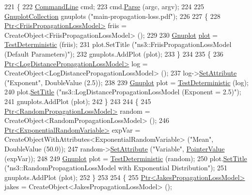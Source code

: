 \begin{DoxyCode}
221 \{
222   \hyperlink{classns3_1_1CommandLine}{CommandLine} cmd;
223   cmd.\hyperlink{classns3_1_1CommandLine_a5c10b85b3207e5ecb48d907966923156}{Parse} (argc, argv);
224   
225   \hyperlink{classns3_1_1GnuplotCollection}{GnuplotCollection} gnuplots (\textcolor{stringliteral}{"main-propagation-loss.pdf"});
226 
227   \{
228     \hyperlink{classns3_1_1Ptr}{Ptr<FriisPropagationLossModel>} friis = 
      CreateObject<FriisPropagationLossModel> ();
229 
230     \hyperlink{classns3_1_1Gnuplot}{Gnuplot} \hyperlink{lte__amc_8m_a5942306abe9f005572e4344e3cdef528}{plot} = \hyperlink{main-propagation-loss_8cc_a4e5137292d7c72e9726190680c642e7d}{TestDeterministic} (friis);
231     plot.SetTitle (\textcolor{stringliteral}{"ns3::FriisPropagationLossModel (Default Parameters)"});
232     gnuplots.AddPlot (plot);
233   \}
234 
235   \{
236     \hyperlink{classns3_1_1Ptr}{Ptr<LogDistancePropagationLossModel>} log = 
      CreateObject<LogDistancePropagationLossModel> ();
237     log->\hyperlink{classns3_1_1ObjectBase_ac60245d3ea4123bbc9b1d391f1f6592f}{SetAttribute} (\textcolor{stringliteral}{"Exponent"}, DoubleValue (2.5));
238 
239     \hyperlink{classns3_1_1Gnuplot}{Gnuplot} plot = \hyperlink{main-propagation-loss_8cc_a4e5137292d7c72e9726190680c642e7d}{TestDeterministic} (log);
240     plot.\hyperlink{classns3_1_1Gnuplot_ac01f15633d49f0239f8a45293a1e04f0}{SetTitle} (\textcolor{stringliteral}{"ns3::LogDistancePropagationLossModel (Exponent = 2.5)"});
241     gnuplots.AddPlot (plot);
242   \}
243 
244   \{
245     \hyperlink{classns3_1_1Ptr}{Ptr<RandomPropagationLossModel>} random = 
      CreateObject<RandomPropagationLossModel> ();
246     \hyperlink{classns3_1_1Ptr}{Ptr<ExponentialRandomVariable>} expVar = 
      CreateObjectWithAttributes<ExponentialRandomVariable> (\textcolor{stringliteral}{"Mean"}, DoubleValue (50.0));
247     random->\hyperlink{classns3_1_1ObjectBase_ac60245d3ea4123bbc9b1d391f1f6592f}{SetAttribute} (\textcolor{stringliteral}{"Variable"}, \hyperlink{classns3_1_1PointerValue}{PointerValue} (expVar));
248 
249     \hyperlink{classns3_1_1Gnuplot}{Gnuplot} plot = \hyperlink{main-propagation-loss_8cc_a4e5137292d7c72e9726190680c642e7d}{TestDeterministic} (random);
250     plot.\hyperlink{classns3_1_1Gnuplot_ac01f15633d49f0239f8a45293a1e04f0}{SetTitle} (\textcolor{stringliteral}{"ns3::RandomPropagationLossModel with Exponential Distribution"});
251     gnuplots.AddPlot (plot);
252   \}
253 
254   \{
255     \hyperlink{classns3_1_1Ptr}{Ptr<JakesPropagationLossModel>} jakes = 
      CreateObject<JakesPropagationLossModel> ();

\end{DoxyCode}
